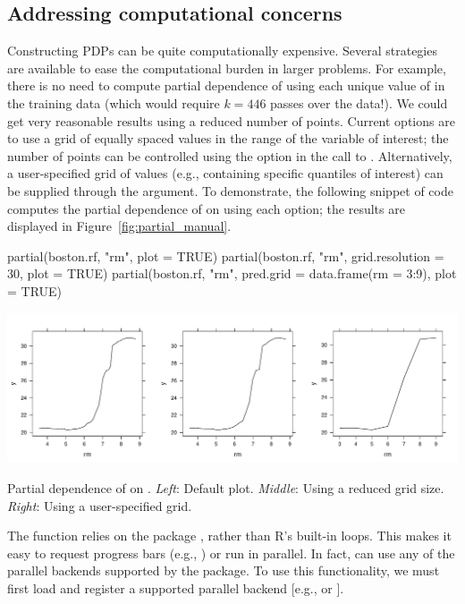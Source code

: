 \subsection{Addressing computational concerns}

Constructing PDPs can be quite computationally expensive. Several strategies are available to ease the computational burden in larger problems. For example, there is no need to compute partial dependence of  using each unique value of  in the training data (which would require $k = 446$ passes over the data!). We could get very reasonable results using a reduced number of points. Current options are to use a grid of equally spaced values in the range of the variable of interest; the number of points can be controlled using the  option in the call to . Alternatively, a user-specified grid of values (e.g., containing specific quantiles of interest) can be supplied through the  argument. To demonstrate, the following snippet of code computes the partial dependence of  on  using each option; the results are displayed in Figure~\ref{fig:partial_manual}.
\begin{example}
partial(boston.rf, "rm", plot = TRUE)
partial(boston.rf, "rm", grid.resolution = 30, plot = TRUE)
partial(boston.rf, "rm", pred.grid = data.frame(rm = 3:9), plot = TRUE)
\end{example}

\begin{widefigure}[htbp]
  \centering
  \includegraphics[width=0.8\linewidth]{partial_manual}
  \caption{Partial dependence of  on . \textit{Left}: Default plot. \textit{Middle}: Using a reduced grid size. \textit{Right}: Using a user-specified grid.}
  \label{fig:partial_manual}
\end{widefigure}

The  function relies on the  package \citep{plyr-pkg}, rather than R's built-in  loops. This makes it easy to request progress bars (e.g., ) or run  in parallel. In fact,  can use any of the parallel backends supported by the  package. To use this functionality, we must first load and register a supported parallel backend [e.g.,  \citep{doMC-pkg} or  \citep{doParallel-pkg}].

